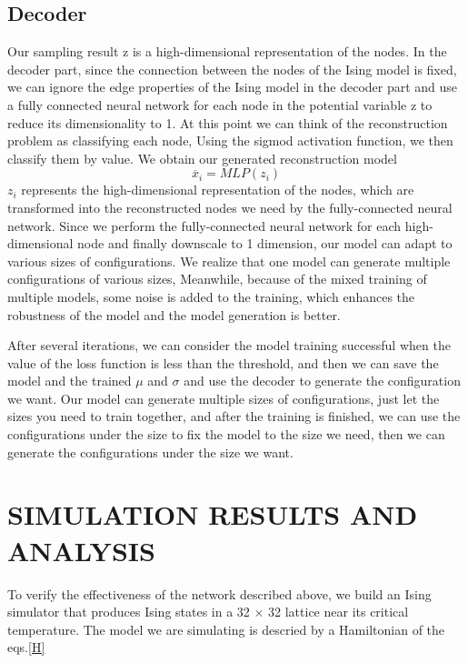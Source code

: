 \documentclass[%
reprint,
amsmath,amssymb,
aps,
]{revtex4-2}
\begin{document}
	\subsection{Decoder}
	Our sampling result z is a high-dimensional representation of the nodes. In the decoder part, since the connection between the nodes of the Ising model is fixed, we can ignore the edge properties of the Ising model in the decoder part and use a fully connected neural network for each node in the potential variable z to reduce its dimensionality to 1. At this point we can think of the reconstruction problem as classifying each node, Using the sigmod activation function, we then classify them by value. We obtain our generated reconstruction model
	\begin{equation}\label{x_i}
		\overline x_i = MLP(z_i)
	\end{equation}
	$z_i$ represents the high-dimensional representation of the nodes, which are transformed into the reconstructed nodes we need by the fully-connected neural network. Since we perform the fully-connected neural network for each high-dimensional node and finally downscale to 1 dimension, our model can adapt to various sizes of configurations. We realize that one model can generate multiple configurations of various sizes, Meanwhile, because of the mixed training of multiple models, some noise is added to the training, which enhances the robustness of the model and the model generation is better.
	
	After several iterations, we can consider the model training successful when the value of the loss function is less than the threshold, and then we can save the model and the trained $\mu$ and $\sigma$ and use the decoder to generate the configuration we want. Our model can generate multiple sizes of configurations, just let the sizes you need to train together, and after the training is finished, we can use the configurations under the size to fix the model to the size we need, then we can generate the configurations under the size we want.

	\section{SIMULATION RESULTS AND ANALYSIS}
	To verify the effectiveness of the network described above, we build an Ising simulator that produces Ising states in a 32 × 32 lattice near its critical temperature. The model we are simulating is descried by a Hamiltonian of the eqs.\ref{H}
	
\end{document}
